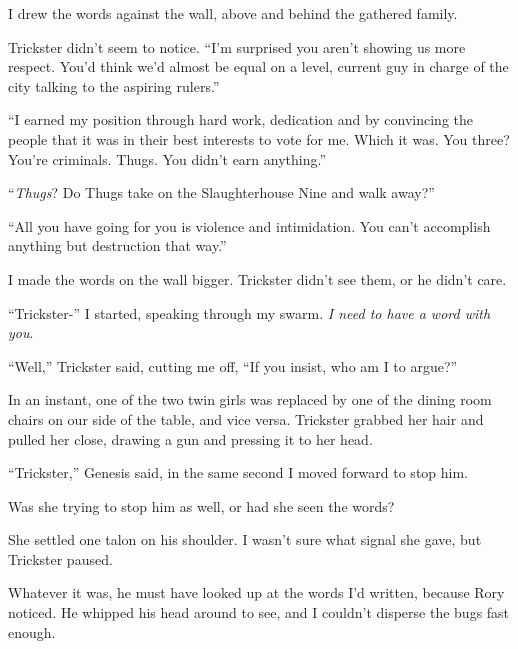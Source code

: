 I drew the words against the wall, above and behind the gathered family.



Trickster didn't seem to notice.  ``I'm surprised you aren't showing us more respect.  You'd think we'd almost be equal on a level, current guy in charge of the city talking to the aspiring rulers.''



``I earned my position through hard work, dedication and by convincing the people that it was in their best interests to vote for me.  Which it was.  You three?  You're criminals.  Thugs.  You didn't earn anything.''



``\emph{Thugs}?  Do Thugs take on the Slaughterhouse Nine and walk away?''



``All you have going for you is violence and intimidation.  You can't accomplish anything but destruction that way.''



I made the words on the wall bigger.  Trickster didn't see them, or he didn't care.



``Trickster-'' I started, speaking through my swarm.  \emph{I need to have a word with you}.



``Well,'' Trickster said, cutting me off, ``If you insist, who am I to argue?''



In an instant, one of the two twin girls was replaced by one of the dining room chairs on our side of the table, and vice versa.  Trickster grabbed her hair and pulled her close, drawing a gun and pressing it to her head.



``Trickster,'' Genesis said, in the same second I moved forward to stop him.



Was she trying to stop him as well, or had she seen the words?



She settled one talon on his shoulder.  I wasn't sure what signal she gave, but Trickster paused.



Whatever it was, he must have looked up at the words I'd written, because Rory noticed.  He whipped his head around to see, and I couldn't disperse the bugs fast enough.



